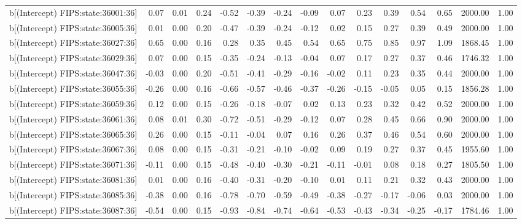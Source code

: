 \begin{table}[ht]
\begin{tabular}{rrrrrrrrrrrrrrr}
  b[(Intercept) FIPS:state:36001:36] & 0.07 & 0.01 & 0.24 & -0.52 & -0.39 & -0.24 & -0.09 & 0.07 & 0.23 & 0.39 & 0.54 & 0.65 & 2000.00 & 1.00 \\ 
  b[(Intercept) FIPS:state:36005:36] & 0.01 & 0.00 & 0.20 & -0.47 & -0.39 & -0.24 & -0.12 & 0.02 & 0.15 & 0.27 & 0.39 & 0.49 & 2000.00 & 1.00 \\ 
  b[(Intercept) FIPS:state:36027:36] & 0.65 & 0.00 & 0.16 & 0.28 & 0.35 & 0.45 & 0.54 & 0.65 & 0.75 & 0.85 & 0.97 & 1.09 & 1868.45 & 1.00 \\ 
  b[(Intercept) FIPS:state:36029:36] & 0.07 & 0.00 & 0.15 & -0.35 & -0.24 & -0.13 & -0.04 & 0.07 & 0.17 & 0.27 & 0.37 & 0.46 & 1746.32 & 1.00 \\ 
  b[(Intercept) FIPS:state:36047:36] & -0.03 & 0.00 & 0.20 & -0.51 & -0.41 & -0.29 & -0.16 & -0.02 & 0.11 & 0.23 & 0.35 & 0.44 & 2000.00 & 1.00 \\ 
  b[(Intercept) FIPS:state:36055:36] & -0.26 & 0.00 & 0.16 & -0.66 & -0.57 & -0.46 & -0.37 & -0.26 & -0.15 & -0.05 & 0.05 & 0.15 & 1856.28 & 1.00 \\ 
  b[(Intercept) FIPS:state:36059:36] & 0.12 & 0.00 & 0.15 & -0.26 & -0.18 & -0.07 & 0.02 & 0.13 & 0.23 & 0.32 & 0.42 & 0.52 & 2000.00 & 1.00 \\ 
  b[(Intercept) FIPS:state:36061:36] & 0.08 & 0.01 & 0.30 & -0.72 & -0.51 & -0.29 & -0.12 & 0.07 & 0.28 & 0.45 & 0.66 & 0.90 & 2000.00 & 1.00 \\ 
  b[(Intercept) FIPS:state:36065:36] & 0.26 & 0.00 & 0.15 & -0.11 & -0.04 & 0.07 & 0.16 & 0.26 & 0.37 & 0.46 & 0.54 & 0.60 & 2000.00 & 1.00 \\ 
  b[(Intercept) FIPS:state:36067:36] & 0.08 & 0.00 & 0.15 & -0.31 & -0.21 & -0.10 & -0.02 & 0.09 & 0.19 & 0.27 & 0.37 & 0.45 & 1955.60 & 1.00 \\ 
  b[(Intercept) FIPS:state:36071:36] & -0.11 & 0.00 & 0.15 & -0.48 & -0.40 & -0.30 & -0.21 & -0.11 & -0.01 & 0.08 & 0.18 & 0.27 & 1805.50 & 1.00 \\ 
  b[(Intercept) FIPS:state:36081:36] & 0.01 & 0.00 & 0.16 & -0.40 & -0.31 & -0.20 & -0.10 & 0.01 & 0.11 & 0.21 & 0.32 & 0.43 & 2000.00 & 1.00 \\ 
  b[(Intercept) FIPS:state:36085:36] & -0.38 & 0.00 & 0.16 & -0.78 & -0.70 & -0.59 & -0.49 & -0.38 & -0.27 & -0.17 & -0.06 & 0.03 & 2000.00 & 1.00 \\ 
  b[(Intercept) FIPS:state:36087:36] & -0.54 & 0.00 & 0.15 & -0.93 & -0.84 & -0.74 & -0.64 & -0.53 & -0.43 & -0.34 & -0.25 & -0.17 & 1784.46 & 1.00 \\ 

\end{tabular}
\end{table}
